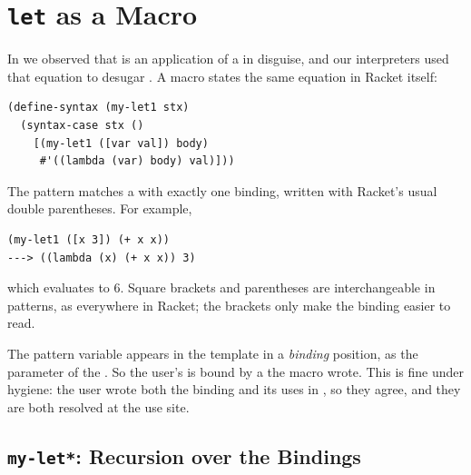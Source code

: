 \section{\texttt{let} as a Macro}
\label{sec:mylet}

In  we observed that  is an application of a  in disguise, and our interpreters used that equation to desugar . A macro states the same equation in Racket itself:
\begin{lstlisting}
(define-syntax (my-let1 stx)
  (syntax-case stx ()
    [(my-let1 ([var val]) body)
     #'((lambda (var) body) val)]))
\end{lstlisting}
The pattern matches a  with exactly one binding, written with Racket's usual double parentheses. For example,
\begin{lstlisting}
(my-let1 ([x 3]) (+ x x))
---> ((lambda (x) (+ x x)) 3)
\end{lstlisting}
which evaluates to 6. Square brackets and parentheses are interchangeable in patterns, as everywhere in Racket; the brackets only make the binding easier to read.

The pattern variable  appears in the template in a \emph{binding} position, as the parameter of the . So the user's  is bound by a  the macro wrote. This is fine under hygiene: the user wrote both the binding  and its uses in , so they agree, and they are both resolved at the use site.

\subsection{\texttt{my-let*}: Recursion over the Bindings}

